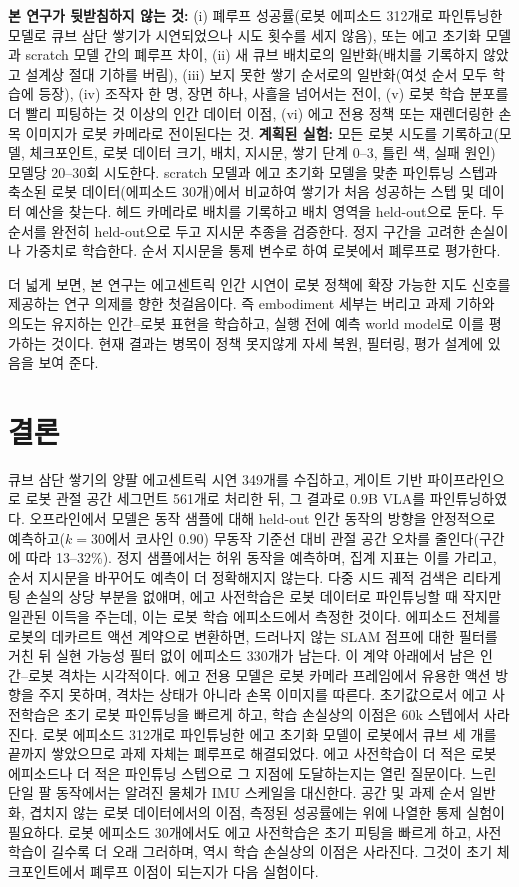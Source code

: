 \documentclass[conference,10pt]{IEEEtran}
\begin{document}
\textbf{본 연구가 뒷받침하지 않는 것:} (i) 폐루프 성공률(로봇 에피소드 312개로 파인튜닝한 모델로 큐브 삼단 쌓기가 시연되었으나 시도
횟수를 세지 않음), 또는 에고 초기화 모델과 scratch 모델 간의 폐루프 차이, (ii) 새 큐브 배치로의 일반화(배치를 기록하지 않았고 설계상
절대 기하를 버림), (iii) 보지 못한 쌓기 순서로의 일반화(여섯 순서 모두 학습에 등장), (iv) 조작자 한 명, 장면 하나, 사흘을 넘어서는 전이,
(v) 로봇 학습 분포를 더 빨리 피팅하는 것 이상의 인간 데이터 이점, (vi) 에고 전용 정책 또는 재렌더링한 손목 이미지가 로봇 카메라로 전이된다는
것. \textbf{계획된 실험:} 모든 로봇 시도를 기록하고(모델, 체크포인트, 로봇 데이터 크기, 배치, 지시문, 쌓기 단계 0--3, 틀린 색, 실패 원인)
모델당 20--30회 시도한다. scratch 모델과 에고 초기화 모델을 맞춘 파인튜닝 스텝과 축소된 로봇 데이터(에피소드 30개)에서 비교하여 쌓기가
처음 성공하는 스텝 및 데이터 예산을 찾는다. 헤드 카메라로 배치를 기록하고 배치 영역을 held-out으로 둔다. 두 순서를 완전히 held-out으로
두고 지시문 추종을 검증한다. 정지 구간을 고려한 손실이나 가중치로 학습한다. 순서 지시문을 통제 변수로 하여 로봇에서 폐루프로 평가한다.

더 넓게 보면, 본 연구는 에고센트릭 인간 시연이 로봇 정책에 확장 가능한 지도 신호를 제공하는 연구 의제를 향한 첫걸음이다. 즉 embodiment
세부는 버리고 과제 기하와 의도는 유지하는 인간--로봇 표현을 학습하고, 실행 전에 예측 world model로 이를 평가하는 것이다. 현재 결과는
병목이 정책 못지않게 자세 복원, 필터링, 평가 설계에 있음을 보여 준다.

\section{결론}
큐브 삼단 쌓기의 양팔 에고센트릭 시연 349개를 수집하고, 게이트 기반 파이프라인으로 로봇 관절 공간 세그먼트 561개로 처리한 뒤, 그 결과로
0.9B VLA를 파인튜닝하였다. 오프라인에서 모델은 동작 샘플에 대해 held-out 인간 동작의 방향을 안정적으로 예측하고($k{=}30$에서 코사인
0.90) 무동작 기준선 대비 관절 공간 오차를 줄인다(구간에 따라 13--32\%). 정지 샘플에서는 허위 동작을 예측하며, 집계 지표는 이를 가리고,
순서 지시문을 바꾸어도 예측이 더 정확해지지 않는다. 다중 시드 궤적 검색은 리타게팅 손실의 상당 부분을 없애며, 에고 사전학습은 로봇
데이터로 파인튜닝할 때 작지만 일관된 이득을 주는데, 이는 로봇 학습 에피소드에서 측정한 것이다. 에피소드 전체를 로봇의 데카르트 액션 계약으로
변환하면, 드러나지 않는 SLAM 점프에 대한 필터를 거친 뒤 실현 가능성 필터 없이 에피소드 330개가 남는다. 이 계약 아래에서 남은 인간--로봇
격차는 시각적이다. 에고 전용 모델은 로봇 카메라 프레임에서 유용한 액션 방향을 주지 못하며, 격차는 상태가 아니라 손목 이미지를 따른다.
초기값으로서 에고 사전학습은 초기 로봇 파인튜닝을 빠르게 하고, 학습 손실상의 이점은 60k 스텝에서 사라진다. 로봇 에피소드 312개로
파인튜닝한 에고 초기화 모델이 로봇에서 큐브 세 개를 끝까지 쌓았으므로 과제 자체는 폐루프로 해결되었다. 에고 사전학습이 더 적은 로봇
에피소드나 더 적은 파인튜닝 스텝으로 그 지점에 도달하는지는 열린 질문이다. 느린 단일 팔 동작에서는 알려진 물체가 IMU 스케일을 대신한다.
공간 및 과제 순서 일반화, 겹치지 않는 로봇 데이터에서의 이점, 측정된 성공률에는 위에 나열한 통제 실험이 필요하다. 로봇 에피소드 30개에서도
에고 사전학습은 초기 피팅을 빠르게 하고, 사전학습이 길수록 더 오래 그러하며, 역시 학습 손실상의 이점은 사라진다. 그것이 초기
체크포인트에서 폐루프 이점이 되는지가 다음 실험이다.
\end{document}
